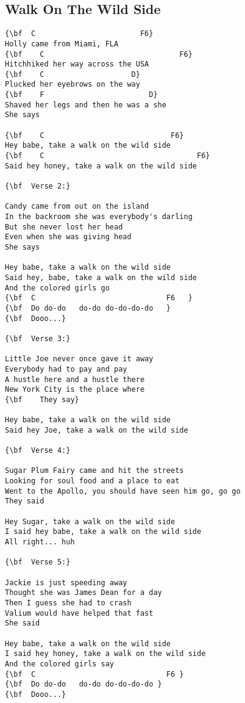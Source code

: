 \documentclass[a4paper]{article}
\begin{document}
\subsection{Walk On The Wild Side}
\begin{Verbatim}[commandchars=\\\{\}]
{\bf  C                        F6}
Holly came from Miami, FLA
{\bf  	C                               F6}
Hitchhiked her way across the USA
{\bf  	C                    D}
Plucked her eyebrows on the way
{\bf  	F                        D}
Shaved her legs and then he was a she
She says

{\bf  	C                             F6}
Hey babe, take a walk on the wild side
{\bf  	C                                   F6}
Said hey honey, take a walk on the wild side

{\bf  Verse 2:}

Candy came from out on the island
In the backroom she was everybody's darling
But she never lost her head
Even when she was giving head
She says

Hey babe, take a walk on the wild side
Said hey, babe, take a walk on the wild side
And the colored girls go
{\bf  C                              F6   }
{\bf  Do do-do   do-do do-do-do-do   }
{\bf  Dooo...}

{\bf  Verse 3:}

Little Joe never once gave it away
Everybody had to pay and pay
A hustle here and a hustle there
New York City is the place where
{\bf  	They say}

Hey babe, take a walk on the wild side
Said hey Joe, take a walk on the wild side

{\bf  Verse 4:}

Sugar Plum Fairy came and hit the streets
Looking for soul food and a place to eat
Went to the Apollo, you should have seen him go, go go
They said

Hey Sugar, take a walk on the wild side
I said hey babe, take a walk on the wild side
All right... huh

{\bf  Verse 5:}

Jackie is just speeding away
Thought she was James Dean for a day
Then I guess she had to crash
Valium would have helped that fast
She said

Hey babe, take a walk on the wild side
I said hey honey, take a walk on the wild side
And the colored girls say
{\bf  C                              F6 }
{\bf  Do do-do   do-do do-do-do-do }
{\bf  Dooo...}

\end{Verbatim}
\newpage
\end{document}
